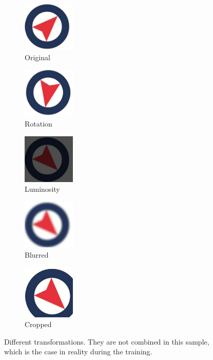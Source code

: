 \documentclass[12pt]{article}%
\begin{document}
\captionsetup[subfigure]{labelformat=simple, labelsep=period}
\begin{figure}
	\centering
	\begin{subfigure}[t]{2.5cm}
		\centering
		\includegraphics[width=2.5cm]{images/logo.png}
		\caption{Original}
	\end{subfigure}
	\begin{subfigure}[t]{2.5cm}
		\centering
		\includegraphics[width=2.5cm]{images/logoRandomRotation.png}
		\caption{Rotation}
	\end{subfigure}
	\begin{subfigure}[t]{2.5cm}
		\centering
		\includegraphics[width=2.5cm]{images/logoLuminosity.png}
		\caption{Luminosity}
	\end{subfigure}
	\begin{subfigure}[t]{2.5cm}
		\centering
		\includegraphics[width=2.5cm]{images/logoBlurred.png}
		\caption{Blurred}
	\end{subfigure}
	\begin{subfigure}[t]{2.5cm}
		\centering
		\includegraphics[width=2.5cm]{images/logoRandomCrop.png}
		\caption{Cropped}
	\end{subfigure}
	\caption{Different transformations. They are not combined in this sample, which is the case in reality during the training.}\label{fig:dataAugmentationSample}
\end{figure}
\end{document}
